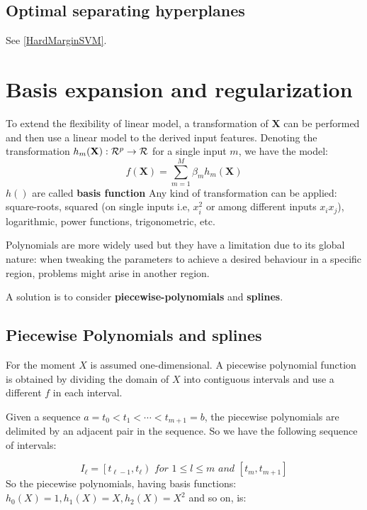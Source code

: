 \documentclass[12pt, letterpaper]{article}
\theoremstyle{definition}
\newcommand{\X}{\mathrm{\mathbf{X}}}
\begin{document}
\subsection{Optimal separating hyperplanes}
\label{OSH}
See \autoref{HardMarginSVM}.

\newpage
\section{Basis expansion and regularization}
To extend the flexibility of linear model, a transformation of $\X$ can be performed and then use a linear model to the derived input features. Denoting the transformation $h_m(\X) : \CMcal{R}^p\rightarrow \CMcal	{R}$ for a single input $m$, we have the model:
\begin{equation}
f(\X) = \sum_{m=1}^M \beta_mh_m(\X)
\end{equation}
$h()$ are called \textbf{basis function}
Any kind of transformation can be applied: square-roots, squared (on single inputs i.e, $x_i^2$ or among different inputs $x_ix_j$), logarithmic, power functions, trigonometric, etc. 

Polynomials are more widely used but they have a limitation due to its global nature: when tweaking the  parameters to achieve a desired behaviour in a specific region, problems might arise in another region.

A solution is to consider \textbf{piecewise-polynomials} and \textbf{splines}.

\subsection{Piecewise Polynomials and splines}
For the moment $X$ is assumed one-dimensional. A piecewise polynomial function is obtained by  dividing the domain of $X$ into contiguous intervals and use a different $f$ in each interval.

Given a sequence $a=t_0<t_1<\cdots<t_{m+1}=b$, the piecewise polynomials are delimited by an adjacent pair in the sequence. So we have the following sequence of intervals:

\begin{equation}
I_\ell = \left[ t_{\ell-1}, t_\ell\right) \textit{ for } 1\le l\le m \textit{ and } \left[t_m, t_{m+1}\right]
\end{equation}
So the piecewise polynomials, having basis functions: $h_0(X) = 1, h_1(X) = X, h_2(X) = X^2$ and so on, is:
\end{document}
